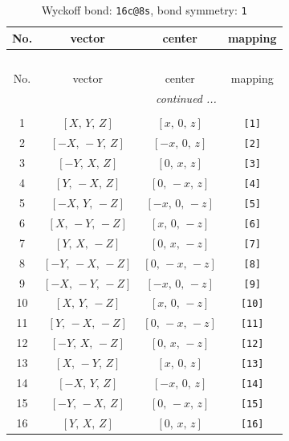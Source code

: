 \documentclass[fleqn,8pt]{jsarticle}
\begin{document}
\begin{longtable}{cccc}
\caption{Wyckoff bond: {\tt 16c@8s}, bond symmetry: {\tt 1}}
 \\
 \hline \hline
No. & vector & center & mapping \\ \hline \endfirsthead

\multicolumn{3}{l}{\tablename\ \thetable{}} \\
 \hline \hline
No. & vector & center & mapping \\ \hline \endhead

 \hline \hline
\multicolumn{3}{r}{\footnotesize\it continued ...} \\ \endfoot

 \hline \hline
\multicolumn{3}{r}{} \\ \endlastfoot

1 & $\left[ X,\, Y,\, Z \right]$ & $\left[ x,\, 0,\, z \right]$ & {\tt [1]} \\ \hline
2 & $\left[ - X,\, - Y,\, Z \right]$ & $\left[ - x,\, 0,\, z \right]$ & {\tt [2]} \\ \hline
3 & $\left[ - Y,\, X,\, Z \right]$ & $\left[ 0,\, x,\, z \right]$ & {\tt [3]} \\ \hline
4 & $\left[ Y,\, - X,\, Z \right]$ & $\left[ 0,\, - x,\, z \right]$ & {\tt [4]} \\ \hline
5 & $\left[ - X,\, Y,\, - Z \right]$ & $\left[ - x,\, 0,\, - z \right]$ & {\tt [5]} \\ \hline
6 & $\left[ X,\, - Y,\, - Z \right]$ & $\left[ x,\, 0,\, - z \right]$ & {\tt [6]} \\ \hline
7 & $\left[ Y,\, X,\, - Z \right]$ & $\left[ 0,\, x,\, - z \right]$ & {\tt [7]} \\ \hline
8 & $\left[ - Y,\, - X,\, - Z \right]$ & $\left[ 0,\, - x,\, - z \right]$ & {\tt [8]} \\ \hline
9 & $\left[ - X,\, - Y,\, - Z \right]$ & $\left[ - x,\, 0,\, - z \right]$ & {\tt [9]} \\ \hline
10 & $\left[ X,\, Y,\, - Z \right]$ & $\left[ x,\, 0,\, - z \right]$ & {\tt [10]} \\ \hline
11 & $\left[ Y,\, - X,\, - Z \right]$ & $\left[ 0,\, - x,\, - z \right]$ & {\tt [11]} \\ \hline
12 & $\left[ - Y,\, X,\, - Z \right]$ & $\left[ 0,\, x,\, - z \right]$ & {\tt [12]} \\ \hline
13 & $\left[ X,\, - Y,\, Z \right]$ & $\left[ x,\, 0,\, z \right]$ & {\tt [13]} \\ \hline
14 & $\left[ - X,\, Y,\, Z \right]$ & $\left[ - x,\, 0,\, z \right]$ & {\tt [14]} \\ \hline
15 & $\left[ - Y,\, - X,\, Z \right]$ & $\left[ 0,\, - x,\, z \right]$ & {\tt [15]} \\ \hline
16 & $\left[ Y,\, X,\, Z \right]$ & $\left[ 0,\, x,\, z \right]$ & {\tt [16]} \\
\end{longtable}
\end{document}

